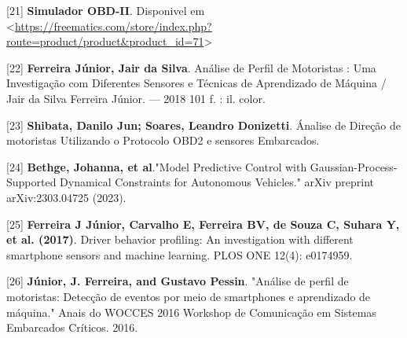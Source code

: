 [21] \textbf{Simulador OBD-II}. Disponivel em <\url{https://freematics.com/store/index.php?route=product/product&product_id=71}>

[22] \textbf{Ferreira Júnior, Jair da Silva}.
Análise de Perfil de Motoristas : Uma Investigação com Diferentes Sensores e Técnicas de
Aprendizado de Máquina / Jair da Silva Ferreira Júnior. — 2018
101 f. : il. color.

[23] \textbf{Shibata, Danilo Jun; Soares, Leandro Donizetti}. Ánalise de Direção de motoristas Utilizando o Protocolo OBD2 e sensores Embarcados.

[24] \textbf{Bethge, Johanna, et al}."Model Predictive Control with Gaussian-Process-Supported Dynamical Constraints for Autonomous Vehicles." arXiv preprint arXiv:2303.04725 (2023).

[25] \textbf{Ferreira J Júnior, Carvalho E, Ferreira BV, de Souza C, Suhara Y, et al. (2017)}. Driver behavior profiling: An investigation with different smartphone sensors and machine learning. PLOS ONE 12(4): e0174959.

[26] \textbf{Júnior, J. Ferreira, and Gustavo Pessin}. "Análise de perfil de motoristas: Detecção de eventos por meio de smartphones e aprendizado de máquina." Anais do WOCCES 2016 Workshop de Comunicação em Sistemas Embarcados Críticos. 2016.